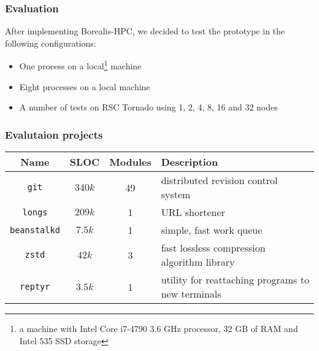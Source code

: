 
\begin{frame}
\frametitle{Evaluation}
After implementing Borealis-HPC, we decided to test the prototype in the following configurations:
	\begin{itemize}
		\item One process on a local\footnote{a machine with Intel Core i7-4790 3.6 GHz processor, 32 GB of RAM and Intel 535 SSD storage} machine
		\item Eight processes on a local machine
		\item A number of tests on RSC Tornado using 1, 2, 4, 8, 16 and 32 nodes
	\end{itemize}
	 
\end{frame}


\begin{frame}
\frametitle{Evalutaion projects}
\begin{table}[tbh]
\centering
\label{table:projects}
\begin{adjustbox}{max width=\textwidth}
\begin{tabular}{|c|c|c|l|}
\hline
Name & SLOC & Modules & Description \\ \hline
\texttt{git} & $340k$ & 49 & distributed revision control system \\ \hline
\texttt{longs} & $209k$ & 1  & URL shortener \\ \hline
\texttt{beanstalkd} & $7.5k$ & 1  & simple, fast work queue \\ \hline
\texttt{zstd} & $42k$  & 3  & fast lossless compression algorithm library \\ \hline
\texttt{reptyr} & $3.5k$ & 1  & utility for reattaching programs to new terminals \\ \hline
\end{tabular}
\end{adjustbox}
\end{table}
\end{frame}


